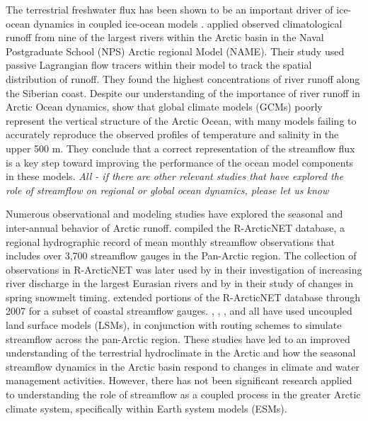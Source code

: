 \documentclass[jgrga, draft]{agutex}
\begin{document}
\begin{article}
The terrestrial freshwater flux has been shown to be an important driver of ice-ocean dynamics in coupled ice-ocean models \citep[e.g.][]{Morison_2012,Lique_2015,Large_2009}.
\citet{Newton_2008} applied observed climatological runoff from nine of the largest rivers within the Arctic basin in the Naval Postgraduate School (NPS) Arctic regional Model (NAME).
Their study used passive Lagrangian flow tracers within their model to track the spatial distribution of runoff.
They found the highest concentrations of river runoff along the Siberian coast.
Despite our understanding of the importance of river runoff in Arctic Ocean dynamics, \citet{Nummelin_2015} show that global climate models (GCMs) poorly represent the vertical structure of the Arctic Ocean, with many models failing to accurately reproduce the observed profiles of temperature and salinity in the upper 500 m.
They conclude that a correct representation of the streamflow flux is a key step toward improving the performance of the ocean model components in these models.
\textit{All - if there are other relevant studies that have explored the role of streamflow on regional or global ocean dynamics, please let us know}

Numerous observational and modeling studies have explored the seasonal and inter-annual behavior of Arctic runoff. %
\citet{Lammers_2001} compiled the R-ArcticNET database, a regional hydrographic record of mean monthly streamflow observations that includes over 3,700 streamflow gauges in the Pan-Arctic region.
The collection of observations in R-ArcticNET was later used by \citet{Shiklomanov_2009} in their investigation of increasing river discharge in the largest Eurasian rivers and by \citet{Tan_2011} in their study of changes in spring snowmelt timing.
\citet{Dai_2009} extended portions of the R-ArcticNET database through 2007 for a subset of coastal streamflow gauges.
\citet{Adam_2007}, \citet{Adam_2008}, \citet{Su_2005}, and \citet{Dai_2009} all have used uncoupled land surface models (LSMs), in conjunction with routing schemes to simulate streamflow across the pan-Arctic region.
These studies have led to an improved understanding of the terrestrial hydroclimate in the Arctic and how the seasonal streamflow dynamics in the Arctic basin respond to changes in climate and water management activities.
However, there has not been significant research applied to understanding the role of streamflow as a coupled process in the greater Arctic climate system, specifically within Earth system models (ESMs). %


\end{article}
\end{document}
